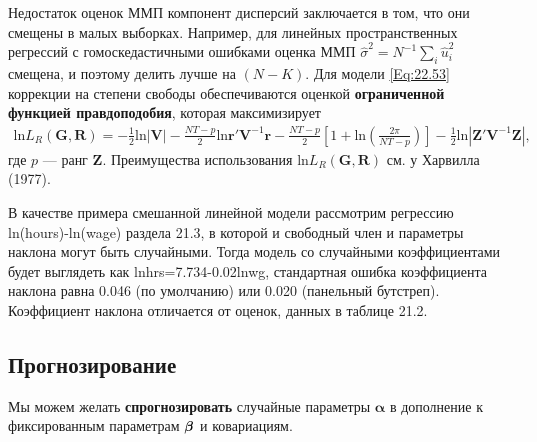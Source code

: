 Недостаток оценок ММП компонент дисперсий заключается в том, что они смещены в малых выборках. Например, для линейных пространственных регрессий с гомоскедастичными ошибками оценка ММП $\hat{\sigma}^2=N^{-1} \sum_i \hat{u}^2_i$ смещена, и поэтому делить лучше на $(N-K)$. Для модели \ref{Eq:22.53} коррекции на степени свободы обеспечиваются оценкой \textbf{ограниченной функцией правдоподобия}, которая максимизирует
\begin{align}
\mathrm{ln} L_R(\mathbf G, \mathbf R)=-\frac{1}{2} \mathrm{ln}|\mathbf V| - \frac{NT-p}{2} \mathrm{ln} \mathbf r' \mathbf V^{-1} \mathbf r - \frac{NT-p}{2} \left[ 1+ \mathrm{ln}(\frac{2\pi}{NT-p})\right]
-\frac{1}{2}\mathrm{ln}| \mathbf Z' \mathbf V^{-1} \mathbf Z|,
\nonumber
\end{align}
где  $p$  --- ранг $\mathbf Z$. Преимущества использования  $\mathrm{ln} L_R(\mathbf G, \mathbf R)$ см. у Харвилла (1977).

В качестве примера смешанной линейной модели рассмотрим регрессию ln(hours)-ln(wage) раздела 21.3, в которой и свободный член и параметры наклона могут быть случайными. Тогда модель со случайными коэффициентами будет выглядеть как lnhrs=7.734-0.02lnwg, стандартная ошибка коэффициента наклона равна 0.046 (по умолчанию) или 0.020 (панельный бутстреп). Коэффициент наклона отличается от оценок, данных в таблице 21.2.

 \subsection{Прогнозирование}

Мы можем желать \textbf{спрогнозировать} случайные параметры $\bm\alpha$  в дополнение к фиксированным параметрам $\bm{\beta}$ и ковариациям.

